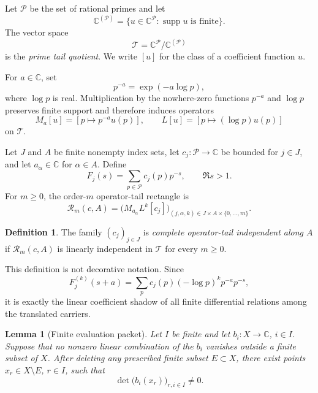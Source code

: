 \documentclass[11pt]{article}
\newtheorem{lemma}[theorem]{Lemma}
\theoremstyle{definition}
\newtheorem{definition}[theorem]{Definition}
\theoremstyle{remark}
\newcommand{\C}{\mathbb C}
\newcommand{\cP}{\mathcal P}
\newcommand{\cT}{\mathcal T}
\newcommand{\supp}{\operatorname{supp}}
\begin{document}
Let \(\cP\) be the set of rational primes and let
\[
  \C^{(\cP)}
  =\{u\in\C^{\cP}:\supp u\text{ is finite}\}.
\]
The vector space
\begin{equation}\label{eq:tail-quotient}
  \cT=\C^{\cP}/\C^{(\cP)}
\end{equation}
is the \emph{prime tail quotient}.  We write \([u]\) for the class of a coefficient
function \(u\).

For \(a\in\C\), set
\[
  p^{-a}=\exp(-a\log p),
\]
where \(\log p\) is real.  Multiplication by the nowhere-zero functions \(p^{-a}\) and
\(\log p\) preserves finite support and therefore induces operators
\[
  M_a[u]=[p\mapsto p^{-a}u(p)],
  \qquad
  L[u]=[p\mapsto(\log p)u(p)]
\]
on \(\cT\).

Let \(J\) and \(A\) be finite nonempty index sets, let
\(c_j:\cP\to\C\) be bounded for \(j\in J\), and let \(a_\alpha\in\C\) for
\(\alpha\in A\).  Define
\begin{equation}\label{eq:carrier}
  F_j(s)=\sum_{p\in\cP}c_j(p)p^{-s},
  \qquad \Re s>1.
\end{equation}
For \(m\geq0\), the order-\(m\) operator-tail rectangle is
\begin{equation}\label{eq:operator-tail-rectangle}
  \mathscr R_m(c,A)
  =
  \bigl(
    M_{a_\alpha}L^k[c_j]
  \bigr)_{(j,\alpha,k)\in J\times A\times\{0,\ldots,m\}}.
\end{equation}

\begin{definition}\label{def:complete-tail}
The family \((c_j)_{j\in J}\) is \emph{complete operator-tail independent along \(A\)}
if \(\mathscr R_m(c,A)\) is linearly independent in \(\cT\) for every \(m\geq0\).
\end{definition}

This definition is not decorative notation.  Since
\[
  F_j^{(k)}(s+a)
  =\sum_p c_j(p)(-\log p)^k p^{-a}p^{-s},
\]
it is exactly the linear coefficient shadow of all finite differential relations among the
translated carriers.

\begin{lemma}[Finite evaluation packet]\label{lem:evaluation-packet}
Let \(I\) be finite and let \(b_i:X\to\C\), \(i\in I\).  Suppose that no nonzero
linear combination of the \(b_i\) vanishes outside a finite subset of \(X\).  After deleting
any prescribed finite subset \(E\subset X\), there exist points
\(x_r\in X\setminus E\), \(r\in I\), such that
\[
  \det\bigl(b_i(x_r)\bigr)_{r,i\in I}\neq0.
\]
\end{lemma}
\end{document}
